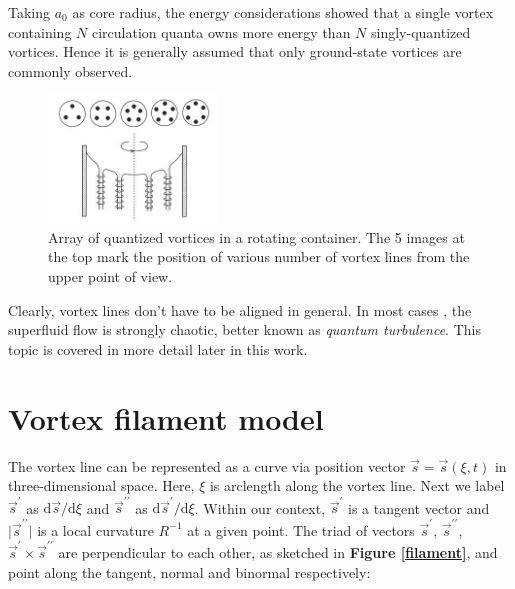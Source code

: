 Taking $a_0$ as core radius, the energy considerations showed that a single vortex containing $N$ circulation quanta owns more energy than $N$ singly-quantized vortices. Hence it is generally assumed that only ground-state vortices are commonly observed.

\begin{figure}[h]
	\centering
	\includegraphics[width=0.4\textwidth]{graphics/theory/rotating-helium}
	\caption{Array of quantized vortices in a rotating container. The 5 images at the top mark the position of various number of vortex lines from the upper point of view.}
	\label{rotating-helium}
\end{figure}

Clearly, vortex lines don't have to be aligned in general. In most cases , the superfluid flow is strongly chaotic, better known as \textit{quantum turbulence}. This topic is covered in more detail later in this work.


\section{Vortex filament model}

The vortex line can be represented as a curve via position vector $\vec{s} = \vec{s}(\xi, t)$ in three-dimensional space. Here, $\xi$ is arclength along the vortex line. Next we label $\vec{s}^{\prime}$ as $\text{d}\vec{s} / \text{d} \xi$ and $\vec{s}^{\prime\prime}$ as $\text{d}\vec{s}^{\prime} / \text{d} \xi$.
Within our context, $\vec{s}^{\prime}$ is a tangent vector and $\vert \vec{s}^{\prime\prime} \vert$ is a local curvature $R^{-1}$ at a given point.
The triad of vectors $\vec{s}^{\prime}$, $\vec{s}^{\prime\prime}$, $\vec{s}^{\prime} \times \vec{s}^{\prime\prime}$ are perpendicular to each other, as sketched in \textbf{Figure \ref{filament}}, and point along the tangent, normal and binormal respectively:

